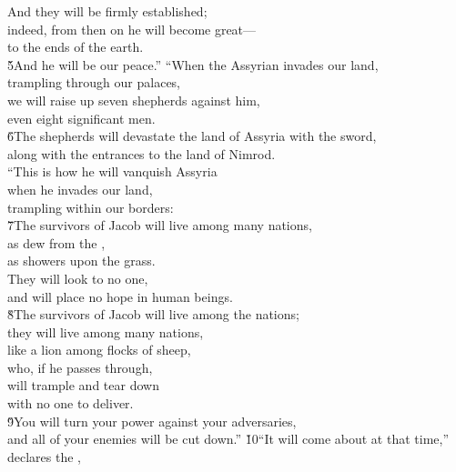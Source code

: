 \begin{poetry}
\poeml And they will be firmly established; \\
\poemll    indeed, from then on he will become great--- \\
\poemlll       to the ends of the earth. \\
\poeml \v{5}And he will be our peace.''
\poeml ``When the Assyrian invades our land, \\
\poemll    trampling through our palaces, \\
\poeml we will raise up seven shepherds against him, \\
\poemll    even eight significant men. \\
\poeml \v{6}The shepherds will devastate the land of Assyria with the sword, \\
\poemll    along with the entrances to the land of Nimrod. \\
\poeml ``This is how he will vanquish Assyria \\
\poemll    when he invades our land, \\
\poemlll       trampling within our borders: \\
\poeml \v{7}The survivors of Jacob will live among many nations, \\
\poemll    as dew from the , \\
\poemlll       as showers upon the grass. \\
\poeml They will look to no one, \\
\poemll    and will place no hope in human beings. \\
\poeml \v{8}The survivors of Jacob will live among the nations; \\
\poemll    they will live among many nations, \\
\poemlll       like a lion among flocks of sheep, \\
\poeml who, if he passes through, \\
\poemll    will trample and tear down \\
\poemlll       with no one to deliver. \\
\poeml \v{9}You will turn your power against your adversaries, \\
\poemll    and all of your enemies will be cut down.''
\poeml \v{10}``It will come about at that time,'' declares the , \\

\end{poetry}
